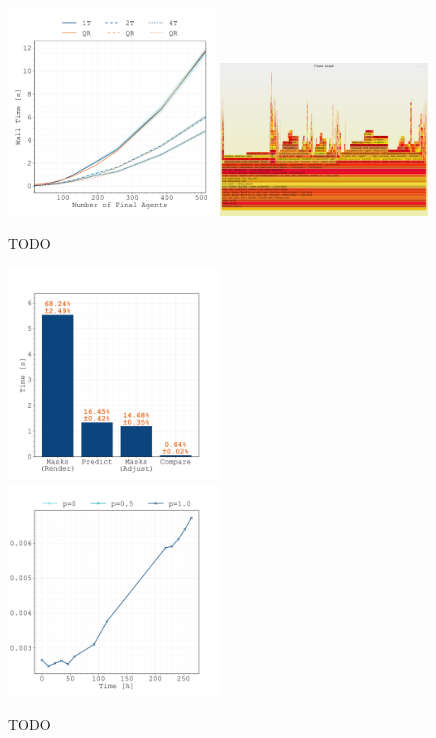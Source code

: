 \documentclass{article}
\begin{document}
\begin{figure}
    \centering
    \includegraphics[width=0.49\textwidth]
        {docs/source/_static/performance/computation-time-with-initial-agents.pdf}
    \includegraphics[width=0.49\textwidth]{docs/source/_static/performance/flamegraph.pdf}
    \caption{TODO}
    \label{fig:performance}
\end{figure}

\begin{figure}
    \centering
    \includegraphics[width=0.5\textwidth]{figures/crm_divide/timings.pdf}%
    \includegraphics[width=0.5\textwidth]{figures/crm_divide/time-evolution.pdf}%
    \caption{TODO}
    \label{fig:timings-crm_divide}
\end{figure}
\end{document}

